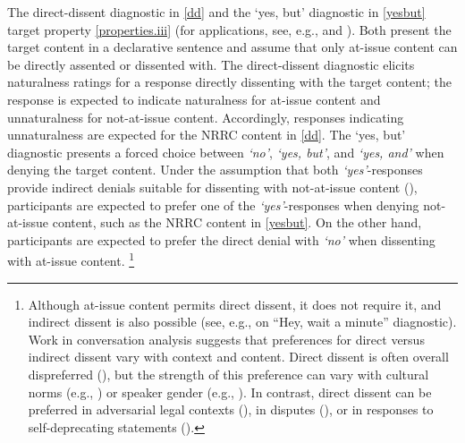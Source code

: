 \documentclass[times,linguex]{glossa}
\begin{document}
The direct-dissent diagnostic in \ref{dd}  and the `yes, but' diagnostic in \ref{yesbut} target property \ref{properties.iii} (for applications, see, e.g., \citealt{faller_semantics_2002,faller_evidentiality_2006,papafragou_epistemic_2006,amaral_review_2007,murray_evidentiality_2010,murray_varieties_2014,anderbois_crossing_2010,anderbois_at-issue_2015,tonhauser_diagnosing_2012,syrett_experimental_2015} and \citealt{xue_correlation_2011,cummins_backgrounding_2013,destruel_cross-linguistic_2015}). Both present the target content in a declarative sentence and assume that only at-issue content can be directly assented or dissented with. %
%
The direct-dissent diagnostic elicits naturalness ratings for a response directly dissenting with the target content; the response is expected to indicate naturalness for at-issue content and unnaturalness for not-at-issue content. Accordingly,  responses indicating unnaturalness are expected for the NRRC content in \ref{dd}.
%
The `yes, but' diagnostic presents a forced choice between \emph{`no'}, \emph{`yes, but'}, and \emph{`yes, and'} when denying the target content. Under the assumption that both \emph{`yes'}-responses provide indirect denials suitable for dissenting with not-at-issue content (\citealt{xue_correlation_2011}), participants are expected to prefer one of the \emph{`yes'}-responses when denying not-at-issue content, such as the NRRC content in \ref{yesbut}. On the other hand, participants are expected to prefer the direct denial with \emph{`no'} when dissenting with at-issue content.%
%
\footnote{%
Although at-issue content permits direct dissent, it does not require it, and indirect dissent is also possible (see, e.g., \citealt{cummins_backgrounding_2013} on  \enquote{Hey, wait a minute} diagnostic).
Work in conversation analysis suggests that preferences for direct versus indirect dissent vary with context and content. Direct dissent is often overall dispreferred (\citealt{sacks_preferences_1987,brown_politeness_1978,pomerantz_agreeing_1984,locher_power_2004}), but the strength of this preference can vary with cultural norms (e.g., \citealt{kakava_opposition_2002}) or speaker gender (e.g., \citealt{tannen_you_1990}). In contrast, direct dissent can be preferred in adversarial legal contexts (\citealt{atkinson_order_1979}), in disputes (\citealt{kotthoff_disagreement_1993,kangasharju_preference_2009}), or in responses to self-deprecating statements (\citealt{pomerantz_agreeing_1984}).
}
\end{document}
